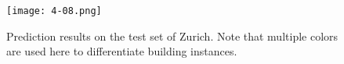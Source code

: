 \begin{figure}[!h]
	\centering
	\texttt{[image: 4-08.png]}
    \caption[Prediction results on the test set of Zurich]{Prediction results on the test set of Zurich. Note that multiple colors are used here to differentiate building instances.}
	\label{fig:finalzh}
\end{figure}